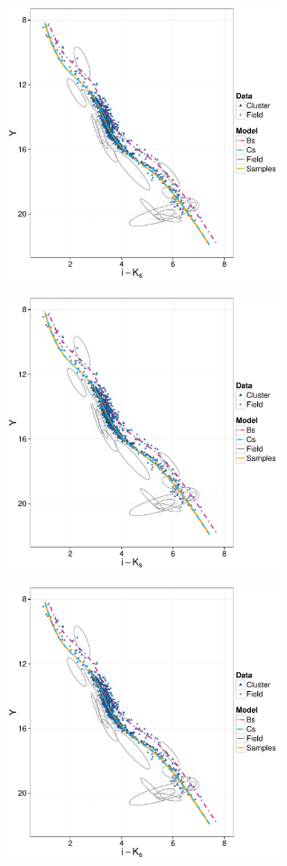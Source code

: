 \begin{figure}[ht!]
    \centering
    \begin{subfigure}[t]{0.48\textwidth}
        \includegraphics[page=1,height=8cm,width=\textwidth]{background/Figures/BHM/CMDs.pdf}
        \caption{}
    \end{subfigure}
    \begin{subfigure}[t]{0.48\textwidth}
      \includegraphics[page=2,height=8cm,width=\textwidth]{background/Figures/BHM/CMDs.pdf}
        \caption{}
    \end{subfigure}
     \begin{subfigure}[t]{0.48\textwidth}
      \includegraphics[page=3,height=8cm,width=\textwidth]{background/Figures/BHM/CMDs.pdf}

\end{subfigure}
\end{figure}
